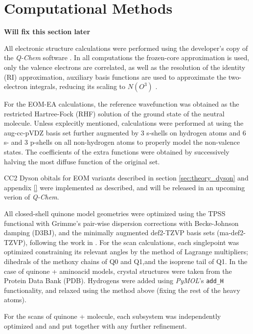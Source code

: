 \chapter{Computational Methods}\label{ch:methods}

\textbf{Will fix this section later}

All electronic structure calculations were performed using the developer's copy of the \textit{Q-Chem} software \cite{QChem5}. In all computations the frozen-core
approximation is used, only the valence electrons are correlated, as well as the resolution of the identity (RI) approximation, auxiliary basis functions are used to approximate the two-electron integrals, reducing its scaling to $N(O^3)$ \cite{hattig2000cc2}.

For the EOM-EA calculations, the reference wavefunction was obtained as the restricted Hartree-Fock (RHF) solution of the ground state of the neutral molecule. Unless explecitly mentioned, calculations were performed at using the aug-cc-pVDZ basis set \cite{dunning1989gaussian} further augmented by 3 s-shells on hydrogen atoms and 6 s- and 3 p-shells on all non-hydrogen atoms \cite{paran2024performance} to properly model the non-valence states. The coefficients of the extra functions were obtained by successively halving the most diffuse function of the original set.

CC2 Dyson obitals for EOM variants described in section \ref{sec:theory_dyson} and appendix \ref{} were implemented as described, and will be released in an upcoming verion of \textit{Q-Chem}.

All closed-shell quinone model geometries were optimized using the TPSS functional\cite{tao2003climbing} with Grimme's pair-wise dispersion corrections with Becke-Johnson damping (D3BJ)\cite{grimme2011effect}, and the minimally augmented\cite{zheng2011minimally} def2-TZVP basis sets\cite{weigend2005balanced} (ma-def2-TZVP), following the work in \cite{schulz2018systematic}. For the scan calculations, each singlepoint was optimized constraining its relevant angles by the method of Lagrange multipliers; dihedrals of the methoxy chains of Q0 and Q1,and the isoprene tail of Q1.
In the case of quinone + aminoacid models, crystal structures were taken from the Protein Data Bank (PDB). Hydrogens were added using \textit{PyMOL}'s \cite{PyMOL} \texttt{add\_H}  functionality, and relaxed using the method above (fixing the rest of the heavy atoms).

For the scans of quinone + molecule, each subsystem was independently optimized and and put together with any further refinement.

